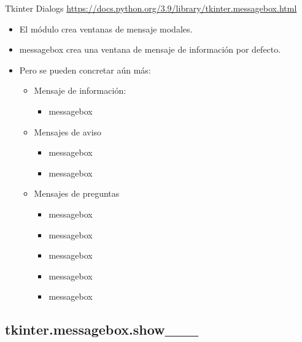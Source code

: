\documentclass[10pt, envcountsect , spanish]{beamer}
\begin{document}
\begin{frame}{Tkinter Dialogs} {\url{https://docs.python.org/3.9/library/tkinter.messagebox.html}}


\begin{itemize}
\item
El módulo  crea ventanas de  mensaje  modales.

\item messagebox crea una ventana de mensaje de información por defecto.

\item Pero se pueden concretar aún más:

\begin{itemize}
\item Mensaje de información:
	\begin{itemize}
	\item messagebox
	\end{itemize}
	
\item Mensajes de aviso
	\begin{itemize}
	\item messagebox
	\item messagebox
	\end{itemize}

\item Mensajes de preguntas
	\begin{itemize}
	\item messagebox
	\item messagebox
	\item messagebox
	\item messagebox
	\item messagebox
	\end{itemize}
\end{itemize}

\end{itemize}
\end{frame}




\subsection{tkinter.messagebox.show\_\_\_}
\end{document}
